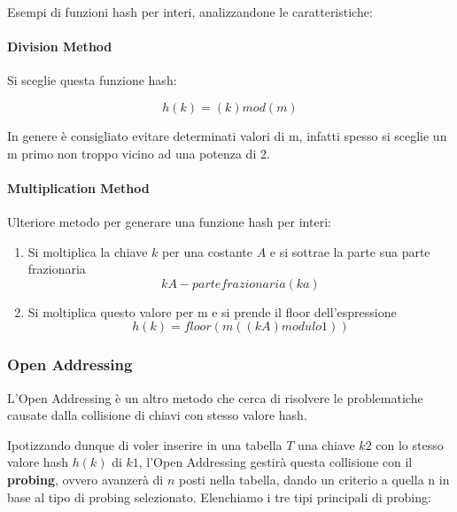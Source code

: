 \documentclass{article}
\begin{document}
Esempi di funzioni hash per interi, analizzandone le caratteristiche:

\paragraph{Division Method} Si sceglie questa funzione hash:

\begin{equation}
    h(k) = (k) mod (m)
\end{equation}

In genere è consigliato evitare determinati valori di m, infatti spesso si sceglie un m primo non troppo vicino ad una potenza di 2.

\paragraph{Multiplication Method} Ulteriore metodo per generare una funzione hash per interi:

\begin{enumerate}
    \item Si moltiplica la chiave $k$ per una costante $A$ e si sottrae la parte sua parte frazionaria
    \begin{equation}
        kA - partefrazionaria(ka)
    \end{equation}
    \item Si moltiplica questo valore per m e si prende il floor dell'espressione
    \begin{equation}
        h(k)=floor(m((kA)modulo1))
    \end{equation}
\end{enumerate}

\newpage

\subsubsection{Open Addressing} L'Open Addressing è un altro metodo che cerca di risolvere le problematiche causate dalla collisione di chiavi con stesso valore hash.

Ipotizzando dunque di voler inserire in una tabella $T$ una chiave $k2$ con lo stesso valore hash $h(k)$ di $k1$, l'Open Addressing gestirà questa collisione con il \textbf{probing}, ovvero avanzerà di $n$ posti nella tabella, dando un criterio a quella n in base al tipo di probing selezionato. Elenchiamo i tre tipi principali di probing:
\end{document}
